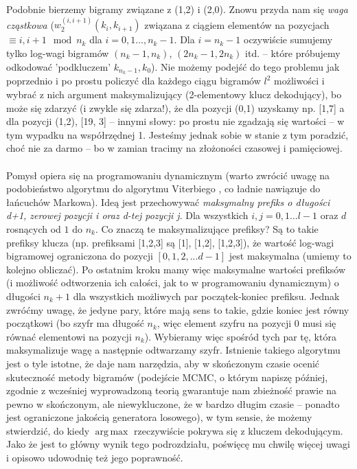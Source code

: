\documentclass[a4paper]{article}
\DeclareMathOperator*{\argmax}{arg\,max}
\theoremstyle{defn}
\theoremstyle{theorem}
\theoremstyle{lemma}
\theoremstyle{cor}
\theoremstyle{fact}
\begin{document}
Podobnie bierzemy bigramy związane z (1,2) i (2,0). Znowu przyda nam się \textit{waga cząstkowa} ($w_2^{(i, i+1)}(k_i, k_{i+1})$  związana z ciągiem elementów na pozycjach $\equiv i, i+1 \mod n_k$ dla $i=0,1...,n_k-1$. Dla $i=n_k-1$ oczywiście sumujemy tylko log-wagi bigramów $(n_k-1, n_k)$, $(2n_k-1, 2n_k)$ itd. – które próbujemy odkodować 'podkluczem' $k_{n_k-1}, k_{0}$). Nie możemy podejść do tego problemu jak poprzednio i po prostu policzyć dla każdego ciągu bigramów $l^2$ możliwości i wybrać z nich argument maksymalizujący (2-elementowy klucz dekodujący), bo może się zdarzyć (i zwykle się zdarza!), że dla pozycji (0,1) uzyskamy np. [1,7] a dla pozycji (1,2), [19, 3] – innymi słowy: po prostu nie zgadzają się wartości – w tym wypadku na współrzędnej 1. Jesteśmy jednak sobie w stanie z tym poradzić, choć nie za darmo – bo w zamian tracimy na złożoności czasowej i pamięciowej. \\\\
Pomysł opiera się na programowaniu dynamicznym (warto zwrócić uwagę na podobieństwo algorytmu do algorytmu Viterbiego \cite{viterbi}, co ładnie nawiązuje do łańcuchów Markowa). Ideą jest przechowywać \textit{maksymalny prefiks o długości d+1, zerowej pozycji i oraz d-tej pozycji j}. Dla wszystkich $i,j=0,1...l-1$ oraz $d$ rosnących od $1$ do $n_k$. Co znaczą te maksymalizujące prefiksy? Są to takie prefiksy klucza (np. prefiksami [1,2,3] są [1], [1,2], [1,2,3]), że wartość log-wagi bigramowej ograniczona do pozycji $[0,1,2,...d-1]$ jest maksymalna (umiemy to kolejno obliczać). Po ostatnim kroku mamy więc maksymalne wartości prefiksów (i możliwość odtworzenia ich całości, jak to w programowaniu dynamicznym) o długości $n_k+1$ dla wszystkich możliwych par początek-koniec prefiksu. Jednak zwróćmy uwagę, że jedyne pary, które mają sens to takie, gdzie koniec jest równy początkowi (bo szyfr ma długość $n_k$, więc element szyfru na pozycji $0$ musi się równać elementowi na pozycji $n_k$). Wybieramy więc spośród tych par tę, która maksymalizuje wagę a następnie odtwarzamy szyfr. Istnienie takiego algorytmu jest o tyle istotne, że daje nam narzędzia, aby w skończonym czasie ocenić skuteczność metody bigramów (podejście MCMC, o którym napiszę później, zgodnie z wcześniej wyprowadzoną teorią gwarantuje nam zbieżność prawie na pewno w skończonym, ale niewykluczone, że w bardzo długim czasie – ponadto jest ograniczone jakością generatora losowego), w tym sensie, że możemy stwierdzić, do kiedy $\argmax$ rzeczywiście pokrywa się z kluczem dekodującym. Jako że jest to główny wynik tego podrozdziału, poświęcę mu chwilę więcej uwagi i opisowo udowodnię też jego poprawność.\\
\end{document}
